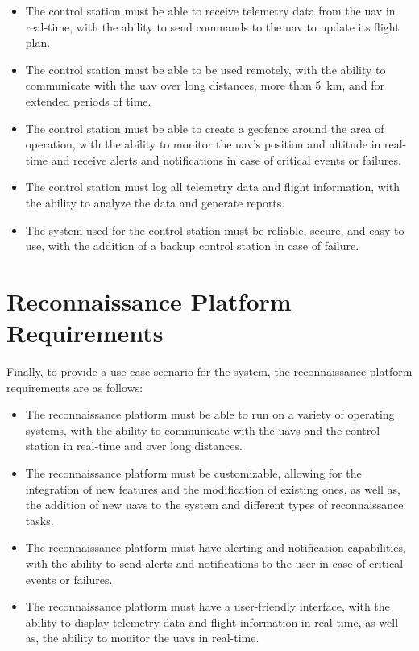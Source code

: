 \begin{itemize}
  \item The control station must be able to receive telemetry data from the \gls{uav} in real-time, with the ability to send commands to the \gls{uav} to update its flight plan.

  \item The control station must be able to be used remotely, with the ability to communicate with the \gls{uav} over long distances, more than \SI{5}{\kilo\meter}, and for extended periods of time.

  \item The control station must be able to create a geofence around the area of operation, with the ability to monitor the \gls{uav}'s position and altitude in real-time and receive alerts and notifications in case of critical events or failures.

  \item The control station must log all telemetry data and flight information, with the ability to analyze the data and generate reports.

  \item The system used for the control station must be reliable, secure, and easy to use, with the addition of a backup control station in case of failure.
\end{itemize}

\section{Reconnaissance Platform Requirements}

Finally, to provide a use-case scenario for the system, the reconnaissance platform requirements are as follows:

\begin{itemize}
  \item The reconnaissance platform must be able to run on a variety of operating systems, with the ability to communicate with the \glspl{uav} and the control station in real-time and over long distances.

  \item The reconnaissance platform must be customizable, allowing for the integration of new features and the modification of existing ones, as well as, the addition of new \glspl{uav} to the system and different types of reconnaissance tasks.

  \item The reconnaissance platform must have alerting and notification capabilities, with the ability to send alerts and notifications to the user in case of critical events or failures.

  \item The reconnaissance platform must have a user-friendly interface, with the ability to display telemetry data and flight information in real-time, as well as, the ability to monitor the \glspl{uav} in real-time.
\end{itemize}


